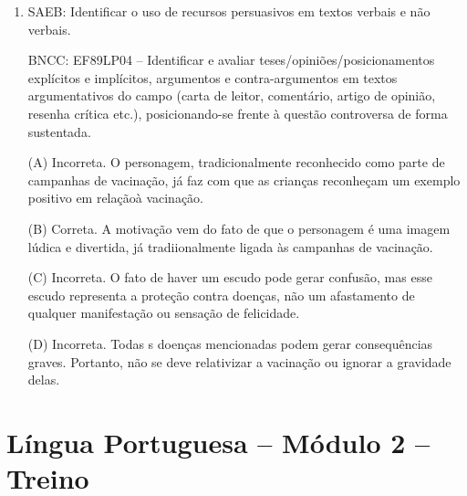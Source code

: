 \begin{enumerate}
(A) Incorreta. O trecho expressa um convite para que o leitor continue
acompanhando a resenha para saber se a autora gostou ou não do livro.

(B) Incorreta. O trecho expressa um gosto da resenhista por um gênero
literário específico e não se refere ainda ao livro em questão, o qual, aliás, nesse ponto da resenha ainda nem tinha sido citado. 

(C) Incorreta. O trecho
expressa uma hipótese ou dúvida que a resenhista deixa em suspense, como
forma de incentivar o leitor a continuar lendo a resenha para saber a
opinião dela sobre o livro. 

(D) Correta. O trecho expressa o diferencial
do livro em questão, pois a resenhista diz que ele é diferente dos
outros livros do gênero distopia futurista por mostrar um apocalipse
financeiro nos Estados Unidos, em vez do mais comum, que é uma invasão
zumbi ou alienígena, e isso a deixa ainda mais instigada a lê-lo e pode
também incentivar o leitor.

\item
SAEB: Identificar o uso de recursos persuasivos em textos verbais e não
verbais. 

BNCC: EF89LP04 -- Identificar e avaliar
teses/opiniões/posicionamentos explícitos e implícitos, argumentos e
contra-argumentos em textos argumentativos do campo (carta de leitor,
comentário, artigo de opinião, resenha crítica etc.), posicionando-se
frente à questão controversa de forma sustentada.

(A) Incorreta. O personagem, tradicionalmente reconhecido como parte de campanhas de vacinação, já faz com que as crianças reconheçam um exemplo positivo em relaçãoà vacinação. 

(B) Correta. A motivação vem do fato de que o personagem é uma imagem lúdica e divertida, já tradiionalmente ligada às campanhas de vacinação.

(C) Incorreta. O fato de haver um escudo pode gerar confusão, mas esse escudo representa a proteção contra doenças, não um afastamento de qualquer manifestação ou sensação de felicidade.

(D) Incorreta. Todas s doenças mencionadas podem gerar consequências graves. Portanto, não se deve relativizar a vacinação ou ignorar a gravidade delas.

\end{enumerate}

\section*{Língua Portuguesa – Módulo 2 – Treino}

